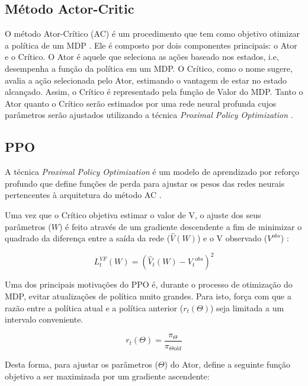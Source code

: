 \subsection{Método Actor-Critic}

O método Ator-Crítico (AC) é um procedimento que tem como objetivo otimizar a política de um MDP \cite{AC}. 
Ele é composto por dois componentes principais: o Ator e o Crítico. 
O Ator é aquele que seleciona as ações baseado nos estados, i.e, desempenha a função da política em um MDP. 
O Crítico, como o nome sugere, avalia a ação selecionada pelo Ator, estimando o vantagem de estar no estado alcançado. 
Assim, o Crítico é representado pela função de Valor do MDP. 
Tanto o Ator quanto o Crítico serão estimados por uma rede neural profunda cujos parâmetros serão ajustados utilizando a técnica \textit{Proximal Policy Optimization} \cite{PPO}.


\subsection{PPO}

A técnica \textit{Proximal Policy Optimization} é um modelo de aprendizado por reforço profundo que define funções de perda para ajustar os pesos das redes neurais pertencentes à arquitetura do método AC \cite{PPO}. 

Uma vez que o Crítico objetiva estimar o valor de V, o ajuste dos seus parâmetros ($W$) é feito através de um gradiente descendente a fim de minimizar o quadrado da diferença entre a saída da rede ($\hat{V}(W)$) e o V observado ($V^{obs}$) \cite{PPO}:


\begin{equation}
    L^{VF}_t(W) = (\hat{V}_t(W) - {V_t}^{obs})^2 
\end{equation}

\noindent
Uma dos principais motivações do PPO é, durante o processo de otimização do MDP, evitar atualizações de política muito grandes. 
Para isto, \cite{PPO} força com que a razão entre a política atual e a política anterior ($r_t(\Theta)$) seja limitada a um intervalo conveniente. 

\begin{equation}
    r_t(\Theta) = \frac{\pi_\Theta}{\pi_{\Theta old}}
\end{equation}

\noindent
Desta forma, para ajustar os parâmetros ($\Theta$) do Ator, \cite{PPO} define a seguinte função objetivo a ser maximizada por um gradiente ascendente:


